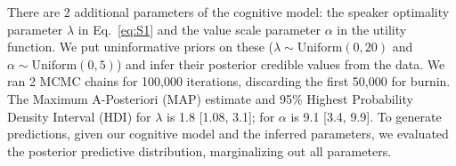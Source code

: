 \documentclass[10pt,letterpaper]{article}
\newcommand{\red}[1]{\textcolor{Red}{#1}}
\newcommand{\ndg}[1]{\textcolor{Green}{[ndg: #1]}}
\begin{document}




There are 2 additional parameters of the cognitive model: the speaker optimality parameter $\lambda$ in Eq.~\ref{eq:S1} and the value scale parameter $\alpha$ in the utility function.
We put uninformative priors on these ($\lambda \sim \text{Uniform}(0,20)$ and $\alpha \sim \text{Uniform}(0, 5)$) and infer their posterior credible values from the data.
We ran 2 MCMC chains for 100,000 iterations, discarding the first 50,000 for burnin.
The Maximum A-Posteriori (MAP) estimate and 95\% Highest Probability Density Interval (HDI) for $\lambda$ is 1.8 [1.08, 3.1]; for $\alpha$ is 9.1 [3.4, 9.9]. %
To generate predictions, given our cognitive model and the inferred parameters, we evaluated the posterior predictive distribution, marginalizing out all parameters.
\end{document}
